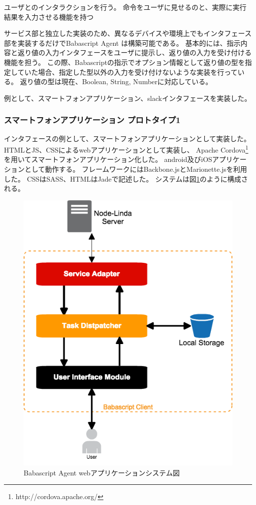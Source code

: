 ユーザとのインタラクションを行う。
命令をユーザに見せるのと、実際に実行結果を入力させる機能を持つ

サービス部と独立した実装のため、異なるデバイスや環境上でもインタフェース部を実装するだけでBabascript
Agent は構築可能である。
基本的には、指示内容と返り値の入力インタフェースをユーザに提示し、返り値の入力を受け付ける機能を担う。
この際、Babascriptの指示でオプション情報として返り値の型を指定していた場合、指定した型以外の入力を受け付けないような実装を行っている。
返り値の型は現在、Boolean, String, Numberに対応している。

例として、スマートフォンアプリケーション、slackインタフェースを実装した。

\subsubsection{スマートフォンアプリケーション
プロトタイプ1}\label{ux30b9ux30deux30fcux30c8ux30d5ux30a9ux30f3ux30a2ux30d7ux30eaux30b1ux30fcux30b7ux30e7ux30f3-ux30d7ux30edux30c8ux30bfux30a4ux30d71}

インタフェースの例として、スマートフォンアプリケーションとして実装した。
HTMLとJS、CSSによるwebアプリケーションとして実装し、 Apache
Cordova\footnote{http://cordova.apache.org/}を用いてスマートフォンアプリケーション化した。
android及びiOSアプリケーションとして動作する。
フレームワークにはBackbone.jsとMarionette.jsを利用した。
CSSはSASS、HTMLはJadeで記述した。
システムは図\ref{fig:client-overview}のように構成される。

\begin{figure}[htbp]
  \begin{center}
  \includegraphics[width=.5\linewidth,bb=0 0 511 650]{images/client-overview.png}
  \end{center}
  \caption{Babascript Agent webアプリケーションシステム図}
  \label{fig:client-overview}
\end{figure}

